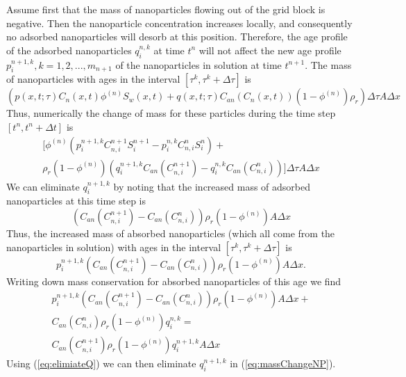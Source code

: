 \documentclass[journal = enfuem, manuscript =  article]{achemso}
\begin{document}
Assume first that the mass of nanoparticles flowing out of the grid block is negative. Then the nanoparticle concentration increases locally, and consequently no adsorbed nanoparticles will desorb at this position. Therefore, the age profile of the adsorbed nanoparticles $q_i^{n,k}$ at time $t^n$ will not affect the new age profile  $p_i^{n+1,k},k=1,2,...,m_{n+1}$ of the nanoparticles in solution at time  $t^{n+1}$. The mass of nanoparticles with ages in the interval $\left[\tau^k, \tau^k+\Delta\tau\right]$ is
\begin{equation*}
    \left(p(x,t;\tau)C_n(x,t)\phi^{(n)}S_w(x,t) + q(x,t;\tau)C_{an}(C_n(x,t))(1-\phi^{(n)})\rho_r\right) \Delta\tau A\Delta x
\end{equation*}
Thus, numerically the change of mass for these particles during the time step $\left[t^n, t^n+\Delta t\right]$ is
\begin{multline} \label{eq:massChangeNP} %
    \bigg[\phi^{(n)}\left(p_i^{n+1,k}C_{n,i}^{n+1}S_i^{n+1}- p_{i}^{n,k}C_{n,i}^{n}S_{i}^{n}\right) +\\ \rho_r(1-\phi^{(n)}) \left(q_i^{n+1,k}C_{an}(C_{n,i}^{n+1})- q_{i}^{n,k}C_{an}(C_{n,i}^{n})\right)\bigg]
    \Delta\tau A\Delta x
\end{multline}
We can eliminate $q_{i}^{n+1,k}$ by noting that the increased mass of adsorbed nanoparticles at this time step is
\begin{equation*}
    \left(C_{an}(C_{n,i}^{n+1})- C_{an}(C_{n,i}^{n})\right)
    \rho_r\left(1-\phi^{(n)}\right) A\Delta x
\end{equation*}
Thus, the increased mass of absorbed nanoparticles (which all come from the nanoparticles in solution) with ages in the interval $\left[\tau^k, \tau^k+\Delta\tau\right]$ is
\begin{equation*}
    p_i^{n+1,k}\left(C_{an}(C_{n,i}^{n+1})- C_{an}(C_{n,i}^{n})\right)
    \rho_r\left(1-\phi^{(n)}\right) A\Delta x.
\end{equation*}
Writing down mass conservation for absorbed nanoparticles of this age we find
\begin{multline} \label{eq:elimiateQ} %
    p_i^{n+1,k}\left(C_{an}(C_{n,i}^{n+1})- C_{an}(C_{n,i}^{n})\right)
    \rho_r\left(1-\phi^{(n)}\right) A\Delta x + \\
    C_{an}(C_{n,i}^{n})\rho_r\left(1-\phi^{(n)}\right)q_i^{n,k} = \\
    C_{an}(C_{n,i}^{n+1})\rho_r\left(1-\phi^{(n)}\right)q_i^{n+1,k}A\Delta x 
\end{multline}
Using (\ref{eq:elimiateQ}) we can then eliminate $q_i^{n+1,k}$ in (\ref{eq:massChangeNP}). 
\end{document}
